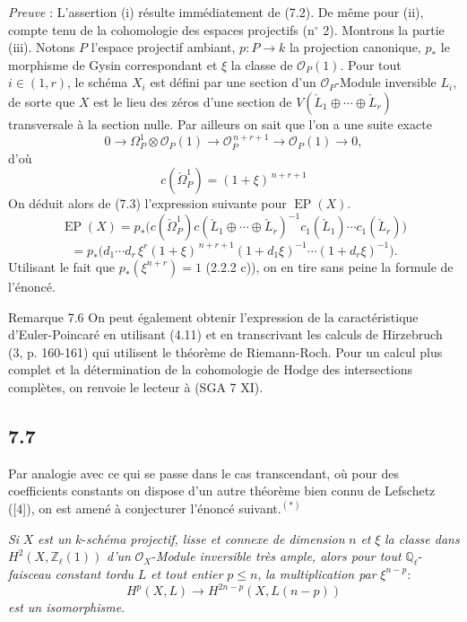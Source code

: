 \emph{Preuve} : L'assertion (i) résulte immédiatement de (7.2). De même pour (ii), compte tenu de la cohomologie des espaces projectifs (n$^\circ$ 2). Montrons la partie (iii). Notons $P$ l'espace projectif ambiant, $p:P\to k$ la projection canonique, $p_*$ le morphisme de Gysin 
correspondant et $\xi$ la classe de $\mathcal{O}_P(1)$. Pour tout $i\in(1,r)$, le schéma $X_i$ est défini par une
section d'un $\mathcal{O}_P$-Module inversible $L_i$, de sorte que $X$ est le lieu des zéros d'une section de $V(\check L_1\oplus\cdots\oplus\check L_r)$ transversale à la section nulle. Par ailleurs on sait que l'on a une suite exacte
\[
0\to\Omega_P^1\otimes\mathcal{O}_P(1)\to\mathcal{O}_P^{\,n+r+1}\to\mathcal{O}_P(1)\to0,
\]
d'où
\[
c(\check\Omega_P^1)=(1+\xi)^{\,n+r+1}
\]
On déduit alors de (7.3) l'expression suivante pour $\operatorname{EP}(X)$.
\[
\operatorname{EP}(X)
=p_*\bigl(c(\check\Omega_P^1)c(\check L_1\oplus\cdots\oplus\check L_r)^{-1}
c_1(\check L_1)\cdots c_1(\check L_r)\bigr)
\]
\[
=p_*\bigl(d_1\cdots d_r\,\xi^r(1+\xi)^{\,n+r+1}
(1+d_1\xi)^{-1}\cdots(1+d_r\xi)^{-1}\bigr).
\]
Utilisant le fait que $p_*(\xi^{n+r})=1$ (2.2.2 c)), on en tire sans peine la formule de l'énoncé.

\begin{statement}{Remarque 7.6}
On peut également obtenir l'expression de la caractéristique d'Euler-Poincaré en utilisant (4.11) et en transcrivant les calculs de Hirzebruch (3, p. 160-161) qui utilisent le théorème de Riemann-Roch. Pour un calcul plus complet et la détermination de la cohomologie de Hodge des intersections complètes, on renvoie le lecteur à (SGA 7 XI).
\end{statement}

\subsection*{7.7}

Par analogie avec ce qui se passe dans le cas transcendant, où pour des coefficients constants on dispose d'un autre théorème bien connu de Lefschetz ([4]), on est amené à conjecturer l'énoncé suivant.$^{(*)}$

 \emph{Si} $X$ \emph{est un} $k$-\emph{schéma projectif, lisse et connexe de dimension} $n$ \emph{et} $\xi$ \emph{la classe dans} $H^2(X,\mathbb{Z}_\ell(1))$ \emph{d'un} $\mathcal{O}_X$-\emph{Module inversible très ample, alors pour tout} $\mathbb{Q}_\ell$-\emph{faisceau constant tordu} $L$ \emph{et tout entier} $p\le n$, \emph{la multiplication par} $\xi^{n-p}$:
\[
H^p(X,L)\to H^{2n-p}(X,L(n-p))
\]
\emph{est un isomorphisme}.

